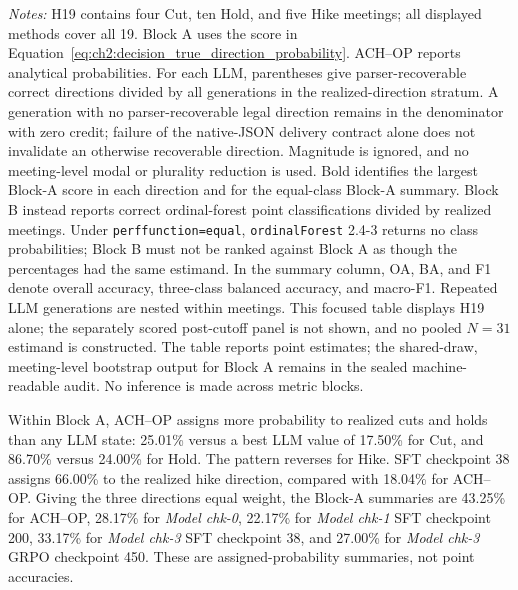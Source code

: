 \begin{table}[H]
\begin{threeparttable}
    \begin{tablenotes}[flushleft]
        \scriptsize
        \item \textit{Notes:} H19 contains four Cut, ten Hold, and five Hike
        meetings; all displayed methods cover all 19. Block A uses the score in
        Equation~\ref{eq:ch2:decision_true_direction_probability}. ACH--OP
        reports analytical probabilities. For each LLM, parentheses give
        parser-recoverable correct directions divided by all generations in
        the realized-direction stratum. A generation with no parser-recoverable
        legal direction remains in the denominator with zero credit; failure
        of the native-JSON delivery contract alone does not invalidate an
        otherwise recoverable direction. Magnitude is ignored, and no
        meeting-level modal or plurality reduction is used. Bold identifies
        the largest Block-A score in each direction and for the equal-class
        Block-A summary. Block B instead reports
        correct ordinal-forest point classifications divided by realized
        meetings. Under \texttt{perffunction=equal}, \texttt{ordinalForest}
        2.4-3 returns no class probabilities; Block B must not be ranked against
        Block A as though the percentages had the same estimand. In the summary
        column, OA, BA, and F1 denote overall accuracy, three-class balanced
        accuracy, and macro-F1. Repeated LLM generations are nested within
        meetings. This focused table displays H19 alone; the separately scored
        post-cutoff panel is not shown, and no pooled \(N=31\) estimand is
        constructed. The table reports point estimates; the shared-draw,
        meeting-level bootstrap output for Block A remains in the sealed
        machine-readable audit. No inference is made across metric blocks.
    \end{tablenotes}
    \end{threeparttable}
\end{table}

Within Block A, ACH--OP assigns more probability to realized cuts and holds
than any LLM state: 25.01\% versus a best LLM value of 17.50\% for Cut, and
86.70\% versus 24.00\% for Hold. The pattern reverses for Hike. SFT checkpoint
38 assigns 66.00\% to the realized hike direction, compared with 18.04\% for
ACH--OP. Giving the three directions equal weight, the Block-A summaries are
43.25\% for ACH--OP, 28.17\% for \textit{Model chk-0}, 22.17\% for
\textit{Model chk-1} SFT checkpoint 200, 33.17\% for \textit{Model chk-3}
SFT checkpoint 38, and 27.00\% for \textit{Model chk-3} GRPO checkpoint 450.
These are assigned-probability summaries, not point accuracies.

